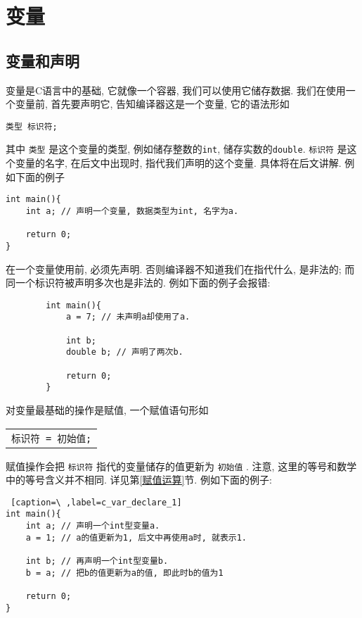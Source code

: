 \chapter{变量} \label{变量}
    \section{变量和声明}
        变量是C语言中的基础, 它就像一个容器, 我们可以使用它储存数据. 我们在使用一个变量前, 首先要声明它, 告知编译器这是一个变量, 它的语法形如
        \begin{center}
            \texttt{类型~标识符;}
        \end{center}

        其中 \texttt{类型} 是这个变量的类型, 例如储存整数的\texttt{int}, 储存实数的\texttt{double}. \texttt{标识符} 是这个变量的名字, 在后文中出现时, 指代我们声明的这个变量. 具体将在后文讲解. 例如下面的例子
\begin{lstlisting}
int main(){
    int a; // 声明一个变量, 数据类型为int, 名字为a. 

    return 0;
}
\end{lstlisting}

        在一个变量使用前, 必须先声明. 否则编译器不知道我们在指代什么, 是非法的; 而同一个标识符被声明多次也是非法的. 例如下面的例子会报错:
        \begin{lstlisting}
        int main(){
            a = 7; // 未声明a却使用了a.
        
            int b;
            double b; // 声明了两次b.
        
            return 0;
        }
        \end{lstlisting}

        对变量最基础的操作是赋值, 一个赋值语句形如
        \begin{center}
        \begin{longtable}{l}
            \texttt{标识符 = 初始值;}
        \end{longtable}
        \end{center}

        赋值操作会把 \texttt{标识符} 指代的变量储存的值更新为 \texttt{初始值} . 注意, 这里的等号和数学中的等号含义并不相同. 详见第\ref{赋值运算}节. 例如下面的例子:
\begin{lstlisting} [caption=\ ,label=c_var_declare_1]
int main(){
    int a; // 声明一个int型变量a.
    a = 1; // a的值更新为1, 后文中再使用a时, 就表示1.

    int b; // 再声明一个int型变量b.
    b = a; // 把b的值更新为a的值, 即此时b的值为1

    return 0;
}
\end{lstlisting}

